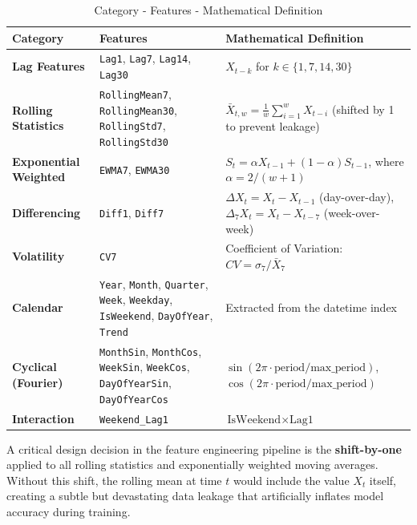\documentclass[12pt, a4paper]{report}
\begin{document}
\begin{table}[H]
\centering
\caption{Category - Features - Mathematical Definition}
\vspace{0.1in}
\begin{tabularx}{\textwidth}{|>{\raggedright\arraybackslash}X|>{\raggedright\arraybackslash}X|>{\raggedright\arraybackslash}X|}
\hline
Category & Features & Mathematical Definition \\ \hline
\hline
\textbf{Lag Features} & \texttt{Lag1}, \texttt{Lag7}, \texttt{Lag14}, \texttt{Lag30} & $X_{t-k}$ for $k \in \{1, 7, 14, 30\}$ \\ \hline
\textbf{Rolling Statistics} & \texttt{RollingMean7}, \texttt{RollingMean30}, \texttt{RollingStd7}, \texttt{RollingStd30} & $\bar{X}_{t,w} = \frac{1}{w}\sum_{i=1}^{w}X_{t-i}$ (shifted by 1 to prevent leakage) \\ \hline
\textbf{Exponential Weighted} & \texttt{EWMA7}, \texttt{EWMA30} & $S_t = \alpha X_{t-1} + (1-\alpha)S_{t-1}$, where $\alpha = 2/(w+1)$ \\ \hline
\textbf{Differencing} & \texttt{Diff1}, \texttt{Diff7} & $\Delta X_t = X_t - X_{t-1}$ (day-over-day), $\Delta_7 X_t = X_t - X_{t-7}$ (week-over-week) \\ \hline
\textbf{Volatility} & \texttt{CV7} & Coefficient of Variation: $CV = \sigma_7 / \bar{X}_7$ \\ \hline
\textbf{Calendar} & \texttt{Year}, \texttt{Month}, \texttt{Quarter}, \texttt{Week}, \texttt{Weekday}, \texttt{IsWeekend}, \texttt{DayOfYear}, \texttt{Trend} & Extracted from the datetime index \\ \hline
\textbf{Cyclical (Fourier)} & \texttt{MonthSin}, \texttt{MonthCos}, \texttt{WeekSin}, \texttt{WeekCos}, \texttt{DayOfYearSin}, \texttt{DayOfYearCos} & $\sin(2\pi \cdot \text{period}/\text{max\_period})$, $\cos(2\pi \cdot \text{period}/\text{max\_period})$ \\ \hline
\textbf{Interaction} & \texttt{Weekend\_Lag1} & $\text{IsWeekend} \times \text{Lag1}$ \\ \hline
\end{tabularx}
\end{table}

A critical design decision in the feature engineering pipeline is the \textbf{shift-by-one} applied to all rolling statistics and exponentially weighted moving averages. Without this shift, the rolling mean at time $t$ would include the value $X_t$ itself, creating a subtle but devastating data leakage that artificially inflates model accuracy during training.
\end{document}
